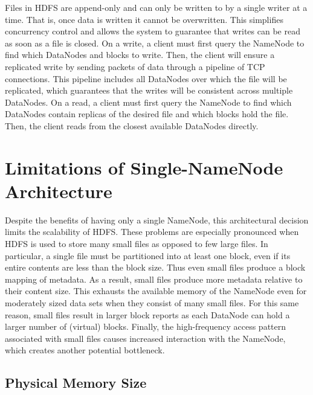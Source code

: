 \documentclass[11pt, a4paper]{article}
\begin{document}
\begin{multicols*}{2}
Files in HDFS are append-only and can only be written to by a single writer at a time. That is, once data is written it cannot be overwritten. This simplifies concurrency control and allows the system to guarantee that writes can be read as soon as a file is closed. On a write, a client must first query the NameNode to find which DataNodes and blocks to write. Then, the client will ensure a replicated write by sending packets of data through a pipeline of TCP connections. This pipeline includes all DataNodes over which the file will be replicated, which guarantees that the writes will be consistent across multiple DataNodes. On a read, a client must first query the NameNode to find which DataNodes contain replicas of the desired file and which blocks hold the file. Then, the client reads from the closest available DataNodes directly.

\section{Limitations of Single-NameNode Architecture}
Despite the benefits of having only a single NameNode, this architectural decision limits the scalability of HDFS. These problems are especially pronounced when HDFS is used to store many small files as opposed to few large files. In particular, a single file must be partitioned into at least one block, even if its entire contents are less than the block size. Thus even small files produce a block mapping of metadata. As a result, small files produce more metadata relative to their content size. This exhausts the available memory of the NameNode even for moderately sized data sets when they consist of many small files. For this same reason, small files result in larger block reports as each DataNode can hold a larger number of (virtual) blocks. Finally, the high-frequency access pattern associated with small files causes increased interaction with the NameNode, which creates another potential bottleneck.

\subsection{Physical Memory Size}


\end{multicols*}
\end{document}
